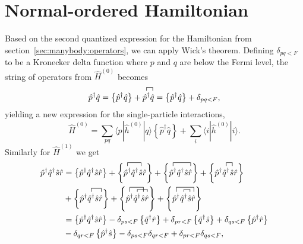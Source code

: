 \section{Normal-ordered Hamiltonian}
Based on the second quantized expression for the Hamiltonian from section~\ref{sec:manybody:operators}, we can apply Wick's theorem.
Defining $\delta_{pq<F}$ to be a Kronecker delta function where $p$ and $q$ are below the Fermi level, the string of operators from $\hat{H}^{(0)}$ becomes
\begin{equation}
\hat{p}^{\dagger} \hat{q}
=
\left\lbrace \hat{p}^{\dagger} \hat{q}\right\rbrace
+
\contraction[1ex]{}{\hat{p}^{\dagger}}{}{\hat{q}}
\hat{p}^{\dagger}\hat{q} 
=
\left\lbrace \hat{p}^{\dagger} \hat{q}\right\rbrace
+
\delta_{pq < F} ,
\end{equation}
yielding a new expression for the single-particle interactions,
\begin{equation}
\hat{H}^{(0)}
= 
\sum_{pq} \langle p|\hat{h}^{(0)} | q\rangle 
\left\lbrace \hat{p}^{\dagger} \hat{q} \right\rbrace
+
\sum_i \langle i | \hat{h}^{(0)} | i \rangle .
\end{equation}
Similarly for $\hat{H}^{(1)}$ we get 
\begin{equation}
\begin{split}
\hat{p}^{\dagger} \hat{q}^{\dagger} \hat{s} \hat{r}
&=
\left\lbrace \hat{p}^{\dagger} \hat{q}^{\dagger} \hat{s} \hat{r} \right\rbrace
+
\left\lbrace
\contraction[1ex]{}{\hat{p}^{\dagger}}{\hat{q}^{\dagger}}{ \hat{s}} \hat{p}^{\dagger} \hat{q}^{\dagger} \hat{s} \hat{r} \right\rbrace
+
\left\lbrace
\contraction[1ex]{}{\hat{p}^{\dagger}}{\hat{q}^{\dagger} \hat{s}}{\hat{r}} \hat{p}^{\dagger} \hat{q}^{\dagger} \hat{s} \hat{r} \right\rbrace
+
\left\lbrace
\contraction[1ex]{\hat{p}^{\dagger}}{\hat{q}^{\dagger}}{}{ \hat{s}} \hat{p}^{\dagger} \hat{q}^{\dagger} \hat{s} \hat{r} \right\rbrace  \\
&+
\left\lbrace
\contraction[1ex]{\hat{p}^{\dagger}}{\hat{q}^{\dagger}}{ \hat{s}}{\hat{r}} \hat{p}^{\dagger} \hat{q}^{\dagger} \hat{s} \hat{r} \right\rbrace 
+
\left\lbrace
\contraction[0.7ex]{\hat{p}^{\dagger}}{\hat{q}^{\dagger}}{ \hat{s}}{\hat{r}}
\contraction[1.3ex]{}{\hat{p}^{\dagger}}{\hat{q}^{\dagger}}{\hat{s}}
\hat{p}^{\dagger} \hat{q}^{\dagger} \hat{s} \hat{r} \right\rbrace
+
\left\lbrace
\contraction[0.7ex]{\hat{p}^{\dagger}}{\hat{q}^{\dagger}}{}{\hat{s}}
\contraction[1.3ex]{}{\hat{p}^{\dagger}}{\hat{q}^{\dagger}\hat{s}}{\hat{r}}
\hat{p}^{\dagger} \hat{q}^{\dagger} \hat{s} \hat{r} \right\rbrace \\
&=
\left\lbrace \hat{p}^{\dagger} \hat{q}^{\dagger} \hat{s} \hat{r} \right\rbrace
-
\delta_{ps <F} \left\lbrace \hat{q}^{\dagger} \hat{r} \right\rbrace
+ 
\delta_{pr <F} \left\lbrace \hat{q}^{\dagger} \hat{s} \right\rbrace
+
\delta_{qs <F} \left\lbrace \hat{p}^{\dagger} \hat{r} \right\rbrace \\
&-
\delta_{qr <F} \left\lbrace \hat{p}^{\dagger} \hat{s} \right\rbrace
-
\delta_{ps <F} \delta_{qr <F}
+
\delta_{pr <F} \delta_{qs <F} ,
\end{split}
\end{equation}
